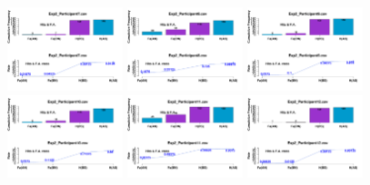 \begin{figure}[th]
\includegraphics[width=0.30\textwidth]{Figures/MirrorRate_Exp2_P7} \includegraphics[width=0.30\textwidth]{Figures/MirrorRate_Exp2_P8} \includegraphics[width=0.30\textwidth]{Figures/MirrorRate_Exp2_P9}
\includegraphics[width=0.30\textwidth]{Figures/MirrorRate_Exp2_P10} \includegraphics[width=0.30\textwidth]{Figures/MirrorRate_Exp2_P11} \includegraphics[width=0.30\textwidth]{Figures/MirrorRate_Exp2_P12}

\end{figure}
